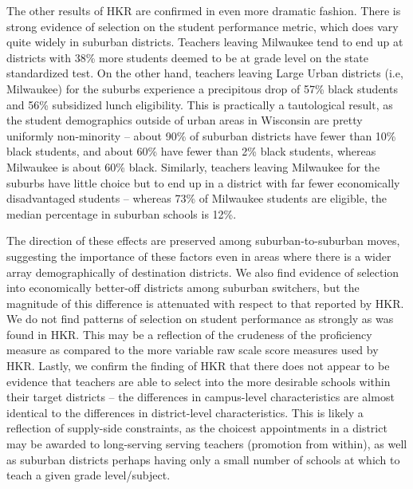 \documentclass[12pt,]{article}
\begin{document}
The other results of HKR are confirmed in even more dramatic fashion.
There is strong evidence of selection on the student performance metric,
which does vary quite widely in suburban districts. Teachers leaving
Milwaukee tend to end up at districts with 38\% more students deemed to
be at grade level on the state standardized test. On the other hand,
teachers leaving Large Urban districts (i.e, Milwaukee) for the suburbs
experience a precipitous drop of 57\% black students and 56\% subsidized
lunch eligibility. This is practically a tautological result, as the
student demographics outside of urban areas in Wisconsin are pretty
uniformly non-minority -- about 90\% of suburban districts have fewer
than 10\% black students, and about 60\% have fewer than 2\% black
students, whereas Milwaukee is about 60\% black. Similarly, teachers
leaving Milwaukee for the suburbs have little choice but to end up in a
district with far fewer economically disadvantaged students -- whereas
73\% of Milwaukee students are eligible, the median percentage in
suburban schools is 12\%.

The direction of these effects are preserved among suburban-to-suburban
moves, suggesting the importance of these factors even in areas where
there is a wider array demographically of destination districts. We also
find evidence of selection into economically better-off districts among
suburban switchers, but the magnitude of this difference is attenuated
with respect to that reported by HKR. We do not find patterns of
selection on student performance as strongly as was found in HKR. This
may be a reflection of the crudeness of the proficiency measure as
compared to the more variable raw scale score measures used by HKR.
Lastly, we confirm the finding of HKR that there does not appear to be
evidence that teachers are able to select into the more desirable
schools within their target districts -- the differences in campus-level
characteristics are almost identical to the differences in
district-level characteristics. This is likely a reflection of
supply-side constraints, as the choicest appointments in a district may
be awarded to long-serving serving teachers (promotion from within), as
well as suburban districts perhaps having only a small number of schools
at which to teach a given grade level/subject.
\end{document}
